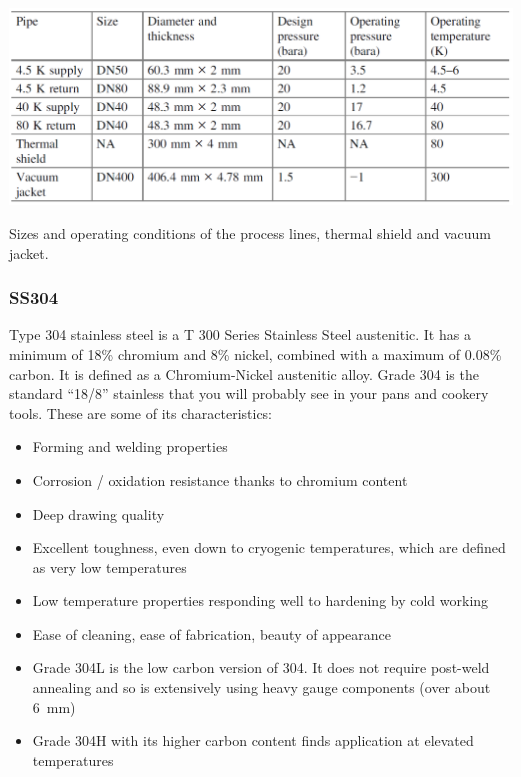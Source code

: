 \begin{table}[H]
    \centering
    \includegraphics[width = \textwidth]{img/figure69.png}
    \caption{Sizes and operating conditions of the process lines, thermal shield and vacuum jacket.}
\end{table}
\subsubsection{SS304}
Type 304 stainless steel is a T 300 Series Stainless Steel austenitic. It has a minimum of 18\% chromium and 8\% nickel, combined with a maximum of 0.08\% carbon. It is defined as a Chromium-Nickel austenitic alloy. Grade 304 is the standard ``18/8'' stainless that you will probably see in your pans and cookery tools. These are some of its characteristics:
\begin{itemize}
    \item Forming and welding properties
    \item Corrosion / oxidation resistance thanks to chromium content
    \item Deep drawing quality
    \item Excellent toughness, even down to cryogenic temperatures, which are defined as very low temperatures
    \item Low temperature properties responding well to hardening by cold working
    \item Ease of cleaning, ease of fabrication, beauty of appearance
    \item Grade 304L is the low carbon version of 304. It does not require post-weld annealing and so is extensively using heavy gauge components (over about \SI{6}{\milli\meter})
    \item Grade 304H with its higher carbon content finds application at elevated temperatures
\end{itemize} 